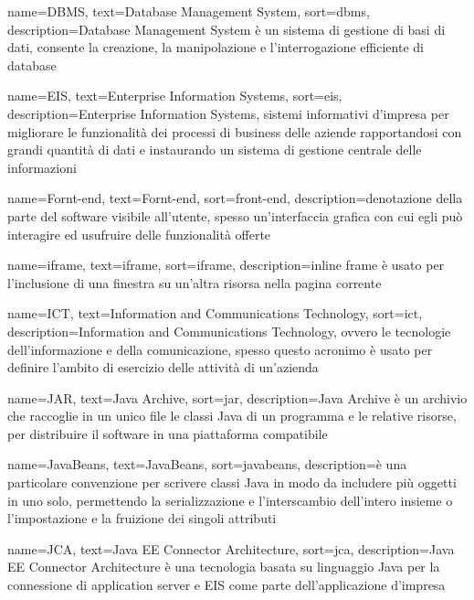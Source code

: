 {
    name=DBMS,
    text=Database Management System,
    sort=dbms,
    description={Database Management System è un sistema di gestione di basi di dati, consente la creazione, la manipolazione e l’interrogazione efficiente di database}
}

{
    name=EIS,
    text=Enterprise Information Systems,
    sort=eis,
    description={Enterprise Information Systems, sistemi informativi d'impresa per migliorare le funzionalità dei processi di business delle aziende rapportandosi con grandi quantità di dati e instaurando un sistema di gestione centrale delle informazioni}
}

{
    name=Fornt-end,
    text=Fornt-end,
    sort=front-end,
    description={denotazione della parte del software visibile all'utente, spesso un'interfaccia grafica con cui egli può interagire ed usufruire delle funzionalità offerte}
}


{
    name=iframe,
    text=iframe,
    sort=iframe,
    description={inline frame è usato per l'inclusione di una finestra su un'altra risorsa nella pagina corrente}
}

{
    name=ICT,
    text=Information and Communications Technology,
    sort=ict,
    description={Information and Communications Technology, ovvero le tecnologie dell’informazione e della comunicazione, 
spesso questo acronimo è usato per definire l'ambito di esercizio delle attività di un'azienda}
}

{
    name=JAR,
    text=Java Archive,
    sort=jar,
    description={Java Archive è un archivio che raccoglie in un unico file le classi Java di un programma e le relative risorse, per distribuire il software in una piattaforma compatibile}
}

{
    name=JavaBeans,
    text=JavaBeans,
    sort=javabeans,
    description={è una particolare convenzione per scrivere classi Java in modo da includere più oggetti in uno solo, permettendo la serializzazione e l'interscambio dell'intero insieme o l'impostazione e la fruizione dei singoli attributi}
}

{
    name=JCA,
    text=Java EE Connector Architecture,
    sort=jca,
    description={Java EE Connector Architecture è una tecnologia basata su linguaggio Java per la connessione di application server e EIS come parte dell'applicazione d'impresa}
}

